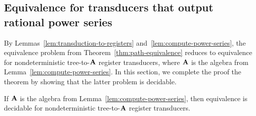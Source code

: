 \subsection{Equivalence for transducers that output rational power series}
\label{sec:decide-power-series}
By Lemmas~\ref{lem:transduction-to-registers} and~\ref{lem:compute-power-series}, the  equivalence problem from Theorem~\ref{thm:path-equivalence} reduces to equivalence for nondeterministic tree-to-$\mathbf{A}$ register transducers, where $\mathbf{A}$ is the algebra from Lemma~\ref{lem:compute-power-series}. In this section, we complete the proof the theorem by showing that the latter problem is decidable.
\begin{lemma}\label{lem:functionality-decidable-power-series} If $\mathbf{A}$ is the algebra from Lemma~\ref{lem:compute-power-series}, then equivalence is decidable for nondeterministic tree-to-$\mathbf{A}$ register transducers. 
\end{lemma}
